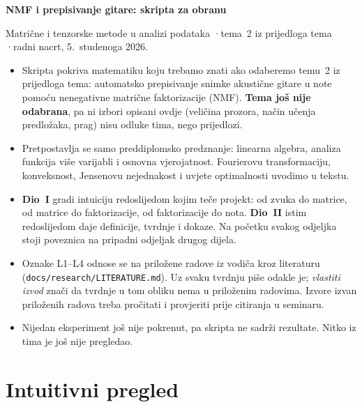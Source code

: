 \documentclass[11pt,a4paper]{article}
\theoremstyle{definition}
\theoremstyle{plain}
\theoremstyle{remark}
\begin{document}
{\sffamily\LARGE\bfseries\color{accent} NMF i prepisivanje gitare: skripta za obranu\par}
\vspace{0.3em}
{\small\color{muted} Matrične i tenzorske metode u analizi podataka \quad·\quad tema~2 iz prijedloga tema
\quad·\quad radni nacrt, 5.~studenoga 2026.\par}
\vspace{0.8em}

\begin{ukratko}
\begin{itemize}
\item Skripta pokriva matematiku koju trebamo znati ako odaberemo temu~2 iz prijedloga tema:
  automatsko prepisivanje snimke akustične gitare u note pomoću nenegativne matrične
  faktorizacije (NMF). \textbf{Tema još nije odabrana}, pa ni izbori opisani ovdje (veličina
  prozora, način učenja predložaka, prag) nisu odluke tima, nego prijedlozi.
\item Pretpostavlja se samo preddiplomsko predznanje: linearna algebra, analiza funkcija više
  varijabli i osnovna vjerojatnost. Fourierovu transformaciju, konveksnost, Jensenovu nejednakost
  i uvjete optimalnosti uvodimo u tekstu.
\item \textbf{Dio~I} gradi intuiciju redoslijedom kojim teče projekt: od zvuka do matrice, od
  matrice do faktorizacije, od faktorizacije do nota. \textbf{Dio~II} istim redoslijedom daje
  definicije, tvrdnje i dokaze. Na početku svakog odjeljka stoji poveznica na pripadni odjeljak
  drugog dijela.
\item Oznake L1--L4 odnose se na priložene radove iz vodiča kroz literaturu
  (\nolinkurl{docs/research/LITERATURE.md}). Uz svaku tvrdnju piše odakle je; \emph{vlastiti izvod}
  znači da tvrdnje u tom obliku nema u priloženim radovima. Izvore izvan priloženih radova treba
  pročitati i provjeriti prije citiranja u seminaru.
\item Nijedan eksperiment još nije pokrenut, pa skripta ne sadrži rezultate. Nitko iz tima je još
  nije pregledao.
\end{itemize}
\end{ukratko}

\tableofcontents

\part{Intuitivni pregled}
\end{document}
